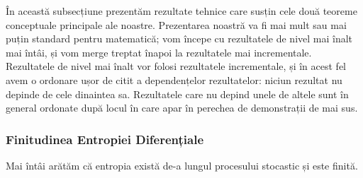 \documentclass[../../book-main_ro.tex]{subfiles}
\begin{document}
În această subsecțiune prezentăm rezultate tehnice care susțin cele două teoreme conceptuale principale ale noastre. Prezentarea noastră va fi mai mult sau mai puțin standard pentru matematică; vom începe cu rezultatele de nivel mai înalt mai întâi, și vom merge treptat înapoi la rezultatele mai incrementale. Rezultatele de nivel mai înalt vor folosi rezultatele incrementale, și în acest fel avem o ordonare ușor de citit a dependențelor rezultatelor: niciun rezultat nu depinde de cele dinaintea sa. Rezultatele care nu depind unele de altele sunt în general ordonate după locul în care apar în perechea de demonstrații de mai sus. 


\subsubsection{Finitudinea Entropiei Diferențiale}

Mai întâi arătăm că entropia există de-a lungul procesului stocastic și este finită.
\end{document}
